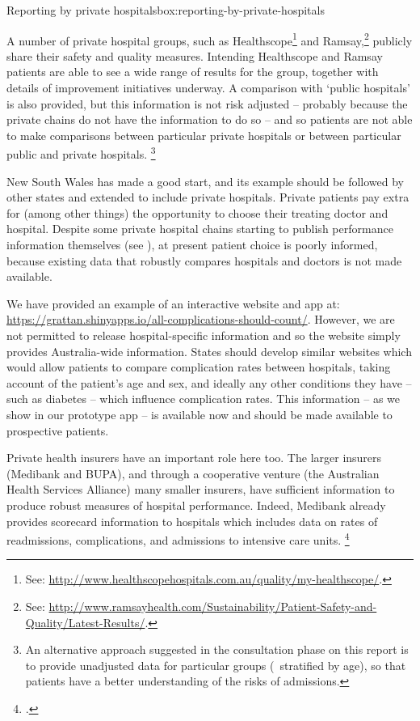 \documentclass[FrontPage]{grattan}
\newcommand*{\ShinyAppURL}{\textcolor{blue}{\url{https://grattan.shinyapps.io/all-complications-should-count/}}}
\begin{document}
\begin{smallbox}{Reporting by private hospitals}{box:reporting-by-private-hospitals}

A number of private hospital groups, such as Healthscope\footnote{See: \textcolor{blue}{\url{http://www.healthscopehospitals.com.au/quality/my-healthscope/}}.}
	and Ramsay,\footnote{See: \textcolor{blue}{\url{http://www.ramsayhealth.com/Sustainability/Patient-Safety-and-Quality/Latest-Results/}}.}
publicly share their safety and quality measures.
Intending Healthscope and Ramsay patients are able to see a wide range of results for the group, together with details of improvement initiatives underway.
A comparison with `public hospitals' is also provided, but this information is not risk adjusted -- probably because the private chains do not have the information to do so -- and so patients are not able to make comparisons between particular private hospitals or between particular public and private hospitals.%
	\footnote{An alternative approach suggested in the consultation phase on this report is to provide unadjusted data for particular groups (\eg~stratified by age), so that patients have a better understanding of the risks of admissions.}
\end{smallbox}

New South Wales has made a good start, and its example should be followed by other states and extended to include private hospitals.
Private patients pay extra for (among other things) the opportunity to choose their treating doctor and hospital.
Despite some private hospital chains starting to publish performance information themselves (see ), at present patient choice is poorly informed, because existing data that robustly compares hospitals and doctors is not made available.

We have provided an example of an interactive website and app at: \ShinyAppURL{}. However, we are not permitted to release hospital-specific information and so the website simply provides Australia-wide information. 
States should develop similar websites which would allow patients to compare complication rates between hospitals, taking account of the patient's age and sex, and ideally any other conditions they have -- such as diabetes -- which influence complication rates.
This information -- as we show in our prototype app -- is available now and should be made available to prospective patients.

Private health insurers have an important role here too.
The larger insurers (Medibank and BUPA), and through a cooperative venture (the Australian Health Services Alliance) many smaller insurers, have sufficient information to produce robust measures of hospital performance.
Indeed, Medibank already provides scorecard information to hospitals which includes data on rates of readmissions, complications, and admissions to intensive care units.%
	\footcite{Rankin-2017-Outcome-measurement-in-private-hospital}
\end{document}

